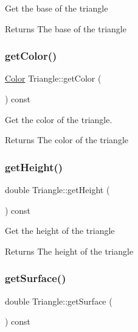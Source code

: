 Get the base of the triangle \begin{DoxyReturn}{Returns}
The base of the triangle 
\end{DoxyReturn}
\mbox{\label{classTriangle_a515e7990f136e3ce529924d422d062d2}} 
\subsubsection{\texorpdfstring{get\+Color()}{getColor()}}
{\footnotesize\ttfamily \hyperlink{classColor}{Color} Triangle\+::get\+Color (\begin{DoxyParamCaption}{ }\end{DoxyParamCaption}) const}



Get the color of the triangle. 

\begin{DoxyReturn}{Returns}
The color of the triangle 
\end{DoxyReturn}
\mbox{\label{classTriangle_a87849ce466ed942076f1cece11047981}} 
\subsubsection{\texorpdfstring{get\+Height()}{getHeight()}}
{\footnotesize\ttfamily double Triangle\+::get\+Height (\begin{DoxyParamCaption}{ }\end{DoxyParamCaption}) const}

Get the height of the triangle \begin{DoxyReturn}{Returns}
The height of the triangle 
\end{DoxyReturn}
\mbox{\label{classTriangle_a43ee8a9653872903a782615d2fc5e977}} 
\subsubsection{\texorpdfstring{get\+Surface()}{getSurface()}}
{\footnotesize\ttfamily double Triangle\+::get\+Surface (\begin{DoxyParamCaption}{ }\end{DoxyParamCaption}) const}

